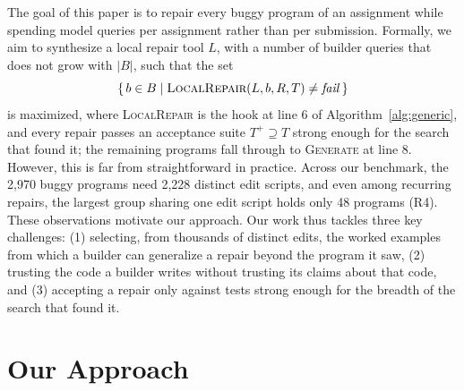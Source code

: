 \documentclass[acmsmall,screen,review,anonymous,nonacm]{acmart}
\newcommand{\Fn}[1]{\textsc{#1}}
\newcommand{\V}[1]{\ensuremath{\mathit{#1}}}
\begin{document}
The goal of this paper is to repair every buggy program of an assignment while spending model queries per assignment rather than per submission. Formally, we aim to synthesize a local repair tool $L$, with a number of builder queries that does not grow with $|B|$, such that the set
\[
\{\, b \in B \mid \Fn{LocalRepair}(L, b, R, T) \neq \V{fail} \,\}
\]
is maximized, where \Fn{LocalRepair} is the hook at line 6 of Algorithm~\ref{alg:generic}, and every repair passes an acceptance suite $T^{+} \supseteq T$ strong enough for the search that found it; the remaining programs fall through to \Fn{Generate} at line 8. However, this is far from straightforward in practice. Across our benchmark, the 2{,}970 buggy programs need 2{,}228 distinct edit scripts, and even among recurring repairs, the largest group sharing one edit script holds only 48 programs (R4). These observations motivate our approach. Our work thus tackles three key challenges: (1) selecting, from thousands of distinct edits, the worked examples from which a builder can generalize a repair beyond the program it saw, (2) trusting the code a builder writes without trusting its claims about that code, and (3) accepting a repair only against tests strong enough for the breadth of the search that found it.

\section{Our Approach}
\label{sec:approach}
\end{document}
